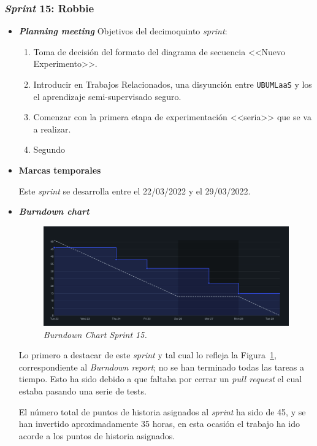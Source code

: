 \subsubsection{\textit{Sprint} 15: Robbie}
\begin{itemize}
\item \textbf{\textit{Planning meeting}}
Objetivos del decimoquinto \textit{sprint}:
\begin{enumerate}
\item Toma de decisión del formato del diagrama de secuencia <<Nuevo Experimento>>.
\item Introducir en Trabajos Relacionados, una disyunción entre \texttt{UBUMLaaS} y los el aprendizaje semi-supervisado seguro.
\item Comenzar con la primera etapa de experimentación <<seria>> que se va a realizar.
\item Segundo
\end{enumerate}
\item \textbf{Marcas temporales}

Este \textit{sprint} se desarrolla entre el 22/03/2022 y el 29/03/2022.

\item \textbf{\textit{Burndown chart}}
\begin{figure}
\begin{center}
\includegraphics[width=\textwidth]{../img/anexos/sprints/BD-Sprint15}
\caption{\textit{Burndown Chart Sprint 15.}}\label{fig:BD-Sprint15}
\end{center}
\end{figure}

Lo primero a destacar de este \textit{sprint} y tal cual lo refleja la Figura~\ref{fig:BD-Sprint15}, correspondiente al \textit{Burndown report}; no se han terminado todas las tareas a tiempo. Esto ha sido debido a que faltaba por cerrar un \textit{pull request} el cual estaba pasando una serie de tests.

El número total de puntos de historia asignados al \textit{sprint} ha sido de 45, y se han invertido aproximadamente 35 horas, en esta ocasión el trabajo ha ido acorde a los puntos de historia asignados.


\end{itemize}
